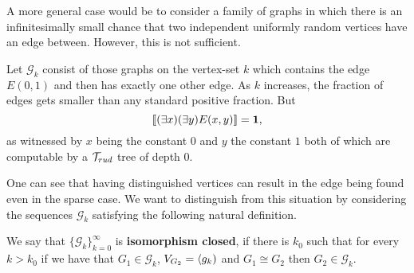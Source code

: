 A more general case would be to consider a family of graphs in which there is an infinitesimally small chance that two independent uniformly random vertices have an edge between. However, this is not sufficient.

\begin{exam}
Let $\mathcal{G}_k$ consist of those graphs on the vertex-set $k$ which contains the edge $E(0,1)$ and then has exactly one other edge. As $k$ increases, the fraction of edges gets smaller than any standard positive fraction. But
\[[\![(\exists x)(\exists y)E(x,y)]\!]=\textbf{1},\]
as witnessed by $x$ being the constant $0$ and $y$ the constant $1$ both of which are computable by a $\mathcal{T}_{rud}$ tree of depth $0$.
\end{exam}

One can see that having distinguished vertices can result in the edge being found even in the sparse case. We want to distinguish from this situation by considering the sequences $\mathcal{G}_k$ satisfying the following natural definition.

\begin{defi}
We say that $\{\mathcal{G}_k\}_{k=0}^\infty$ is \textbf{isomorphism closed}, if there is $k_0$ such that for every $k>k_0$ if we have that $G_1\in\mathcal{G}_k$, $V_{G_2}=\langle g_k)$ and $G_1\cong G_2$ then $G_2\in\mathcal{G}_k$.
\end{defi}



